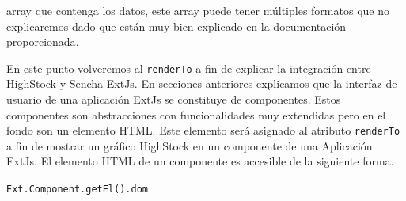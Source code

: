	array que contenga los datos, este array puede tener múltiples formatos que no explicaremos dado que están muy bien explicado en la
	documentación proporcionada\cite{HighStockDoc}.
	\par
	En este punto volveremos al \texttt{renderTo} a fin de explicar la integración entre HighStock y Sencha ExtJs. En secciones anteriores
	explicamos que la interfaz de usuario de una aplicación ExtJs se constituye de componentes. Estos componentes son abstracciones con
	funcionalidades muy extendidas pero en el fondo son un elemento HTML. Este elemento será asignado al atributo \texttt{renderTo} a fin de
	mostrar un gráfico HighStock en un componente de una Aplicación ExtJs. El elemento HTML de un componente es accesible de la siguiente forma.
    		\begin{center} \texttt{Ext.Component.getEl().dom}  \end{center}

